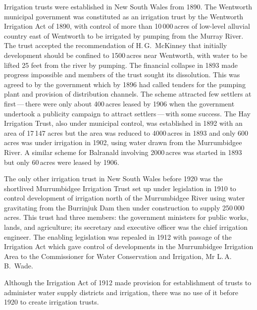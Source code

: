 Irrigation trusts were established in New South Wales from 1890.  The
Wentworth municipal government was constituted as an irrigation trust
by the Wentworth Irrigation Act 
of 1890, with control of more than 10\,000\,acres of low-level
alluvial country east of Wentworth to be irrigated by pumping from the
Murray River.   The trust accepted the
recommendation of H.\,G.~McKinney that initially development should be
confined to 1500\,acres near Wentworth, with water to be lifted 25
feet from the river by pumping.  The financial collapse in 1893 made
progress impossible and members of the trust sought its dissolution.
This was agreed to by the government which by 1896 had called tenders
for the pumping plant and provision of distribution channels. The
scheme attracted few settlers at first\,---\,there were only about
400\,acres leased by 1906 when the government undertook a publicity
campaign to attract settlers\,---\,with some success.  The Hay
Irrigation Trust,
 also
under municipal control, was established in 1892 with an area of
17\,147 acres but the area was reduced to 4000\,acres in 1893 and only
600\,acres was under irrigation in 1902, using water drawn from the
Murrumbid\-gee River.   A similar scheme for
Balranald  involving 2000\,acres was started in
1893 but only 60\,acres were leased by 1906.

The only other irrigation trust in New South Wales before 1920 was the
shortlived Murrumbidgee Irrigation Trust
 set up under legislation in
1910 to control development of irrigation north of the Murrumbidgee
River  using water gravitating from the
Burrinjuk Dam
 then under construction to supply 250\,000\,acres.
This trust had three members: the government ministers for public
works, lands, and agriculture; its secretary and executive officer was
the chief irrigation engineer.  The enabling legislation was repealed
in 1912 with passage of the Irrigation Act which gave control of
developments in the Murrumbidgee Irrigation Area to the Commissioner
for Water Conservation and Irrigation, Mr
L.\,A.\,B.~Wade. 

Although the Irrigation Act  of 1912 made
provision for establishment of trusts to administer water supply
districts and irrigation, there was no use of it before 1920 to create
irrigation trusts.

